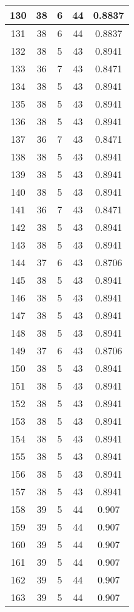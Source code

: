 \documentclass[letterpaper, 12pt]{article}
\begin{document}
\begin{longtable}{|c|c|c|c|c|}
\hline
130 & 38 & 6 & 44 & 0.8837 \\
\hline
131 & 38 & 6 & 44 & 0.8837 \\
\hline
132 & 38 & 5 & 43 & 0.8941 \\
\hline
133 & 36 & 7 & 43 & 0.8471 \\
\hline
134 & 38 & 5 & 43 & 0.8941 \\
\hline
135 & 38 & 5 & 43 & 0.8941 \\
\hline
136 & 38 & 5 & 43 & 0.8941 \\
\hline
137 & 36 & 7 & 43 & 0.8471 \\
\hline
138 & 38 & 5 & 43 & 0.8941 \\
\hline
139 & 38 & 5 & 43 & 0.8941 \\
\hline
140 & 38 & 5 & 43 & 0.8941 \\
\hline
141 & 36 & 7 & 43 & 0.8471 \\
\hline
142 & 38 & 5 & 43 & 0.8941 \\
\hline
143 & 38 & 5 & 43 & 0.8941 \\
\hline
144 & 37 & 6 & 43 & 0.8706 \\
\hline
145 & 38 & 5 & 43 & 0.8941 \\
\hline
146 & 38 & 5 & 43 & 0.8941 \\
\hline
147 & 38 & 5 & 43 & 0.8941 \\
\hline
148 & 38 & 5 & 43 & 0.8941 \\
\hline
149 & 37 & 6 & 43 & 0.8706 \\
\hline
150 & 38 & 5 & 43 & 0.8941 \\
\hline
151 & 38 & 5 & 43 & 0.8941 \\
\hline
152 & 38 & 5 & 43 & 0.8941 \\
\hline
153 & 38 & 5 & 43 & 0.8941 \\
\hline
154 & 38 & 5 & 43 & 0.8941 \\
\hline
155 & 38 & 5 & 43 & 0.8941 \\
\hline
156 & 38 & 5 & 43 & 0.8941 \\
\hline
157 & 38 & 5 & 43 & 0.8941 \\
\hline
158 & 39 & 5 & 44 & 0.907 \\
\hline
159 & 39 & 5 & 44 & 0.907 \\
\hline
160 & 39 & 5 & 44 & 0.907 \\
\hline
161 & 39 & 5 & 44 & 0.907 \\
\hline
162 & 39 & 5 & 44 & 0.907 \\
\hline
163 & 39 & 5 & 44 & 0.907 \\

\end{longtable}
\end{document}
